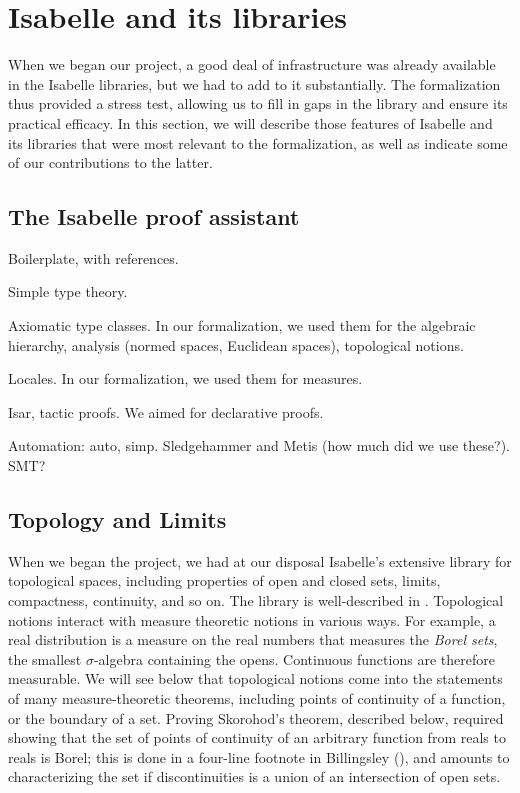 \documentclass{svjour3}
\newcommand{\todo}[1]{{\color{red}#1}}
\begin{document}
\section{Isabelle and its libraries}
\label{section:isabelle}

When we began our project, a good deal of infrastructure was already available in the Isabelle libraries, but we had to add to it substantially. The formalization thus provided a stress test, allowing us to fill in gaps in the library and ensure its practical efficacy. In this section, we will describe those features of Isabelle and its libraries that were most relevant to the formalization, as well as indicate some of our contributions to the latter.

\subsection{The Isabelle proof assistant}

\todo{
Boilerplate, with references.

Simple type theory.

Axiomatic type classes. In our formalization, we used them for the algebraic hierarchy, analysis (normed spaces, Euclidean spaces), topological notions.

Locales. In our formalization, we used them for measures.

Isar, tactic proofs. We aimed for declarative proofs.

Automation: auto, simp. Sledgehammer and Metis (how much did we use these?). SMT?
}

\subsection{Topology and Limits}

When we began the project, we had at our disposal Isabelle's extensive library for topological spaces, including properties of open and closed sets, limits, compactness, continuity, and so on. The library is well-described in \cite{hoelzl:et:al:13}. Topological notions interact with measure theoretic notions in various ways. For example, a real distribution is a measure on the real numbers that measures the \emph{Borel sets}, the smallest $\sigma$-algebra containing the opens. Continuous functions are therefore measurable. We will see below that topological notions come into the statements of many measure-theoretic theorems, including points of continuity of a function, or the boundary of a set. Proving Skorohod's theorem, described below, required showing that the set of points of continuity of an arbitrary function from reals to reals is Borel; this is done in a four-line footnote in Billingsley (\cite[page 334]{billingsley:95}), and amounts to characterizing the set if discontinuities is a union of an intersection of open sets.
\end{document}
